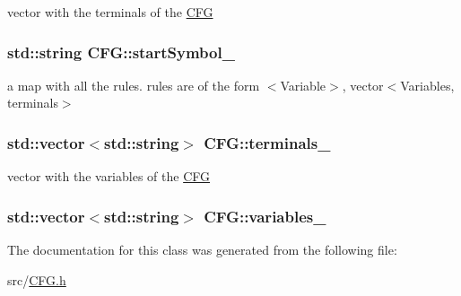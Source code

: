 vector with the terminals of the \hyperlink{classCFG}{\-C\-F\-G} 

\hypertarget{classCFG_a21527e2ffbb0b5bf8995ebae725858eb}{
\subsubsection[{start\-Symbol\-\_\-}]{\setlength{\rightskip}{0pt plus 5cm}std\-::string {\bf \-C\-F\-G\-::start\-Symbol\-\_\-}}}\label{d7/dd4/classCFG_a21527e2ffbb0b5bf8995ebae725858eb}


a map with all the rules. rules are of the form $<$\-Variable$>$, vector$<$\-Variables, terminals$>$ 

\hypertarget{classCFG_ac105b578d6237fc6ff28e54c98bbb1b8}{
\subsubsection[{terminals\-\_\-}]{\setlength{\rightskip}{0pt plus 5cm}std\-::vector$<$std\-::string$>$ {\bf \-C\-F\-G\-::terminals\-\_\-}}}\label{d7/dd4/classCFG_ac105b578d6237fc6ff28e54c98bbb1b8}


vector with the variables of the \hyperlink{classCFG}{\-C\-F\-G} 

\hypertarget{classCFG_a7369373d17b20520d7b72d43f471cda9}{
\subsubsection[{variables\-\_\-}]{\setlength{\rightskip}{0pt plus 5cm}std\-::vector$<$std\-::string$>$ {\bf \-C\-F\-G\-::variables\-\_\-}}}\label{d7/dd4/classCFG_a7369373d17b20520d7b72d43f471cda9}


\-The documentation for this class was generated from the following file\-:\begin{DoxyCompactItemize}
\item 
src/\hyperlink{CFG_8h}{\-C\-F\-G.\-h}\end{DoxyCompactItemize}
